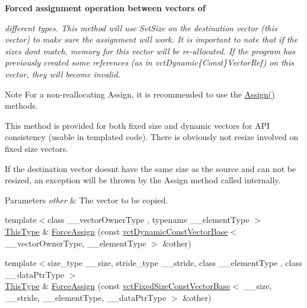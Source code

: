 \begin{Indent}{\bf Forced assignment operation between vectors of}\par
{\em different types. This method will use Set\+Size on the destination vector (this vector) to make sure the assignment will work. It is important to note that if the sizes don\textquotesingle{}t match, memory for this vector will be re-\/allocated. If the program has previously created some references (as in vct\+Dynamic\{Const\}Vector\+Ref) on this vector, they will become invalid.

\begin{DoxyNote}{Note}
For a non-\/reallocating Assign, it is recommended to use the \hyperlink{classvct_dynamic_vector_base_a0d174f0a9557fd562de13324c14e0b92}{Assign()} methods.

This method is provided for both fixed size and dynamic vectors for A\+P\+I consistency (usable in templated code). There is obviously not resize involved on fixed size vectors.

If the destination vector doesn\textquotesingle{}t have the same size as the source and can not be resized, an exception will be thrown by the Assign method called internally.
\end{DoxyNote}

\begin{DoxyParams}{Parameters}
{\em other} & The vector to be copied. \\
\hline
\end{DoxyParams}
}\begin{DoxyCompactItemize}
\item 
{\footnotesize template$<$class \+\_\+\+\_\+vector\+Owner\+Type , typename \+\_\+\+\_\+element\+Type $>$ }\\\hyperlink{classvct_dynamic_const_vector_base_a39da273523717f678f54d3321ebca3dd}{This\+Type} \& \hyperlink{classvct_dynamic_vector_base_a68ad74bbcd1f57319a155d6310683088}{Force\+Assign} (const \hyperlink{classvct_dynamic_const_vector_base}{vct\+Dynamic\+Const\+Vector\+Base}$<$ \+\_\+\+\_\+vector\+Owner\+Type, \+\_\+\+\_\+element\+Type $>$ \&other)
\item 
{\footnotesize template$<$size\+\_\+type \+\_\+\+\_\+size, stride\+\_\+type \+\_\+\+\_\+stride, class \+\_\+\+\_\+element\+Type , class \+\_\+\+\_\+data\+Ptr\+Type $>$ }\\\hyperlink{classvct_dynamic_const_vector_base_a39da273523717f678f54d3321ebca3dd}{This\+Type} \& \hyperlink{classvct_dynamic_vector_base_ac16a1162151c26e5a12f38e0eaa00c1c}{Force\+Assign} (const \hyperlink{classvct_fixed_size_const_vector_base}{vct\+Fixed\+Size\+Const\+Vector\+Base}$<$ \+\_\+\+\_\+size, \+\_\+\+\_\+stride, \+\_\+\+\_\+element\+Type, \+\_\+\+\_\+data\+Ptr\+Type $>$ \&other)
\end{DoxyCompactItemize}
\end{Indent}
